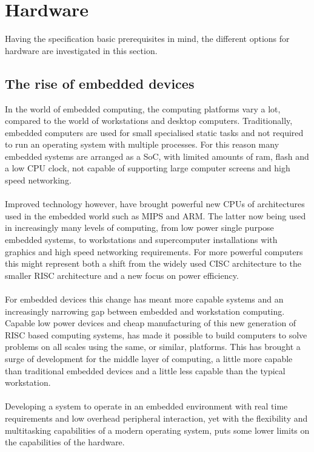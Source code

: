 \section{Hardware}
Having the \arinc{} specification basic prerequisites in mind, the
different options for hardware are investigated in this section.

\subsection{The rise of embedded devices}
In the world of embedded computing, the computing platforms vary a lot,
compared to the world of workstations and desktop computers.
Traditionally, embedded computers are used for small specialised static tasks and
not required to run an operating system with multiple processes.
For this reason many embedded systems are arranged as a SoC,
with limited amounts of ram, flash and a low CPU clock,
not capable of supporting large computer screens and high speed networking.
\\\\
Improved technology however, have brought powerful new CPUs of architectures used in the embedded world
such as MIPS and ARM.
The latter now being used in increasingly many levels of computing, from low power single purpose embedded systems,
to workstations and supercomputer installations with graphics and high speed networking requirements.
For more powerful computers this might represent both a shift from the widely used CISC architecture
to the smaller RISC architecture and a new focus on power efficiency.
\\\\
For embedded devices this change has meant more capable systems
and an increasingly narrowing gap between embedded and workstation computing\cite{raspberry_specs}\cite{windows10_arm}.
Capable low power devices and cheap manufacturing of this new generation of RISC based computing systems,
has made it possible to build computers to solve problems on all scales using the same, or similar, platforms.
This has brought a surge of development for the middle layer of computing,
a little more capable than traditional embedded devices and a little less capable than the typical workstation.
\\\\
Developing a system to operate in an embedded environment with real time requirements
and low overhead peripheral interaction,
yet with the flexibility and multitasking capabilities of a modern operating system,
puts some lower limits on the capabilities of the hardware.

